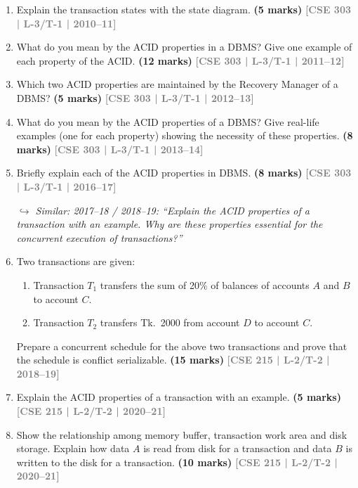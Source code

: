 \documentclass[12pt,a3paper]{article}
\newcommand{\yr}[1]{\hfill\textcolor{gray}{\small\textbf{[#1]}}}
\newcommand{\mk}[1]{\textcolor{orange!70!black}{\small\textbf{(#1 marks)}}}
\newcommand{\variant}[1]{\par\vspace{1pt}\textcolor{blue!50!black}%
  {\footnotesize\textit{$\hookrightarrow$ Similar: #1}}}
\begin{document}
\begin{enumerate}

\item Explain the transaction states with the state diagram.
\mk{5} \yr{CSE 303 | L-3/T-1 | 2010--11}

\item What do you mean by the ACID properties in a DBMS? Give one example of each property of the ACID.
\mk{12} \yr{CSE 303 | L-3/T-1 | 2011--12}

\item Which two ACID properties are maintained by the Recovery Manager of a DBMS?
\mk{5} \yr{CSE 303 | L-3/T-1 | 2012--13}

\item What do you mean by the ACID properties of a DBMS? Give real-life examples (one for each property) showing the necessity of these properties.
\mk{8} \yr{CSE 303 | L-3/T-1 | 2013--14}

\item Briefly explain each of the ACID properties in DBMS.
\mk{8} \yr{CSE 303 | L-3/T-1 | 2016--17}

\variant{2017--18 / 2018--19: ``Explain the ACID properties of a transaction with an example. Why are these properties essential for the concurrent execution of transactions?''}

\item Two transactions are given:
\begin{enumerate}
  \item Transaction $T_1$ transfers the sum of 20\% of balances of accounts $A$ and $B$ to account $C$.
  \item Transaction $T_2$ transfers Tk.\ 2000 from account $D$ to account $C$.
\end{enumerate}
Prepare a concurrent schedule for the above two transactions and prove that the schedule is conflict serializable.
  \mk{15} \yr{CSE 215 | L-2/T-2 | 2018--19}

\item Explain the ACID properties of a transaction with an example.
\mk{5} \yr{CSE 215 | L-2/T-2 | 2020--21}

\item Show the relationship among memory buffer, transaction work area and disk storage. Explain how data $A$ is read from disk for a transaction and data $B$ is written to the disk for a transaction.
\mk{10} \yr{CSE 215 | L-2/T-2 | 2020--21}

\end{enumerate}
\end{document}
